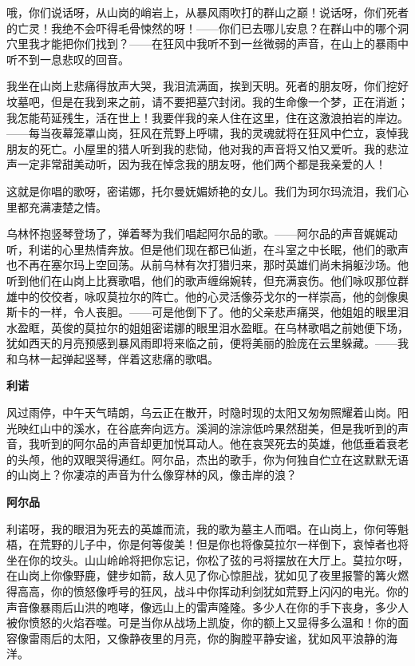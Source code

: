 \documentclass[12pt,oneside]{book}
\begin{document}
哦，你们说话呀，从山岗的峭岩上，从暴风雨吹打的群山之巅！说话呀，你们死者的亡灵！我绝不会吓得毛骨悚然的呀！——你们已去哪儿安息？在群山中的哪个洞穴里我才能把你们找到？——在狂风中我听不到一丝微弱的声音，在山上的暴雨中听不到一息悲叹的回音。

我坐在山岗上悲痛得放声大哭，我泪流满面，挨到天明。死者的朋友呀，你们挖好坟墓吧，但是在我到来之前，请不要把墓穴封闭。我的生命像一个梦，正在消逝；我怎能苟延残生，活在世上！我要伴我的亲人住在这里，住在这激浪拍岩的岸边。——每当夜幕笼罩山岗，狂风在荒野上呼啸，我的灵魂就将在狂风中伫立，哀悼我朋友的死亡。小屋里的猎人听到我的悲恸，他对我的声音将又怕又爱听。我的悲泣声一定非常甜美动听，因为我在悼念我的朋友呀，他们两个都是我亲爱的人！

这就是你唱的歌呀，密诺娜，托尔曼妩媚娇艳的女儿。我们为珂尔玛流泪，我们心里都充满凄楚之情。

乌林怀抱竖琴登场了，弹着琴为我们唱起阿尔品的歌。——阿尔品的声音娓娓动听，利诺的心里热情奔放。但是他们现在都已仙逝，在斗室之中长眠，他们的歌声也不再在塞尔玛上空回荡。从前乌林有次打猎归来，那时英雄们尚未捐躯沙场。他听到他们在山岗上比赛歌唱，他们的歌声缠绵婉转，但充满哀伤。他们咏叹那位群雄中的佼佼者，咏叹莫拉尔的阵亡。他的心灵活像芬戈尔的一样崇高，他的剑像奥斯卡的一样，令人丧胆。——可是他倒下了。他的父亲悲声痛哭，他姐姐的眼里泪水盈眶，英俊的莫拉尔的姐姐密诺娜的眼里泪水盈眶。在乌林歌唱之前她便下场，犹如西天的月亮预感到暴风雨即将来临之前，便将美丽的脸庞在云里躲藏。——我和乌林一起弹起竖琴，伴着这悲痛的歌唱。

\begin{center}
\textbf{利诺}
\end{center}



风过雨停，中午天气晴朗，乌云正在散开，时隐时现的太阳又匆匆照耀着山岗。阳光映红山中的溪水，在谷底奔向远方。溪涧的淙淙低吟果然甜美，但是我听到的声音，我听到的阿尔品的声音却更加悦耳动人。他在哀哭死去的英雄，他低垂着衰老的头颅，他的双眼哭得通红。阿尔品，杰出的歌手，你为何独自伫立在这默默无语的山岗上？你凄凉的声音为什么像穿林的风，像击岸的浪？

\begin{center}
\textbf{阿尔品}
\end{center}


利诺呀，我的眼泪为死去的英雄而流，我的歌为墓主人而唱。在山岗上，你何等魁梧，在荒野的儿子中，你是何等俊美！但是你也将像莫拉尔一样倒下，哀悼者也将坐在你的坟头。山山岭岭将把你忘记，你松了弦的弓将摆放在大厅上。莫拉尔呀，在山岗上你像野鹿，健步如箭，敌人见了你心惊胆战，犹如见了夜里报警的篝火燃得高高，你的愤怒像呼号的狂风，战斗中你挥动利剑犹如荒野上闪闪的电光。你的声音像暴雨后山洪的咆哮，像远山上的雷声隆隆。多少人在你的手下丧身，多少人被你愤怒的火焰吞噬。可是当你从战场上凯旋，你的额上又显得多么温和！你的面容像雷雨后的太阳，又像静夜里的月亮，你的胸膛平静安谧，犹如风平浪静的海洋。
\end{document}
